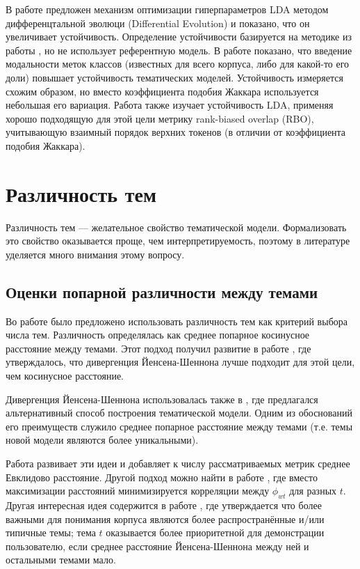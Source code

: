 В работе \cite{agrawal2018wrong} предложен механизм оптимизации гиперпараметров LDA методом дифференцтальной эволюци (Differential Evolution) и показано, что он увеличивает устойчивость. Определение устойчивости базируется на методике из работы \cite{greene14howmany}, но не использует референтную модель. В работе \cite{derbanosov} показано, что введение модальности меток классов (известных для всего корпуса, либо для какой-то его доли) повышает устойчивость тематических моделей. Устойчивость измеряется схожим образом, но вместо коэффициента подобия Жаккара используется небольшая его вариация. Работа \cite{mantyla2018measuring} также изучает устойчивость LDA, применяя хорошо подходящую для этой цели метрику rank-biased overlap (RBO), учитывающую взаимный порядок верхних токенов (в отличии от  коэффициента подобия Жаккара).

\section{Различность тем}

Различность тем --- желательное свойство тематической модели. Формализовать это свойство оказывается проще, чем интерпретируемость, поэтому в литературе уделяется много внимания этому вопросу.

\subsection{Оценки попарной различности между темами}

Во работе \cite{cao2009density} было предложено использовать различность тем как критерий выбора числа тем. Различность определялась как среднее попарное косинусное расстояние между темами. Этот подход получил развитие в работе \cite{deveaud2014accurate}, где утверждалось, что дивергенция Йенсена-Шеннона лучше подходит для этой цели, чем косинусное расстояние.

Дивергенция Йенсена-Шеннона использовалась также в \cite{mimno}, где  предлагался альтернативный способ построения тематической модели. Одним из обоснований его преимуществ служило среднее попарное расстояние между темами (т.е. темы новой модели являются более уникальными).

Работа \cite{tang14look} развивает эти идеи и добавляет к числу рассматриваемых метрик среднее Евклидово расстояние. Другой подход можно найти в работе \cite{tan2010topic}, где вместо максимизации расстояний минимизируется корреляции между $\phi_{wt}$ для разных $t$. Другая интересная идея содержится в работе \cite{wang2011topic}, где утверждается что более важными для понимания корпуса являются более распространённые и/или типичные темы; тема $t$ оказывается более приоритетной для демонстрации пользователю, если среднее расстояние Йенсена-Шеннона между ней и остальными темами мало.

